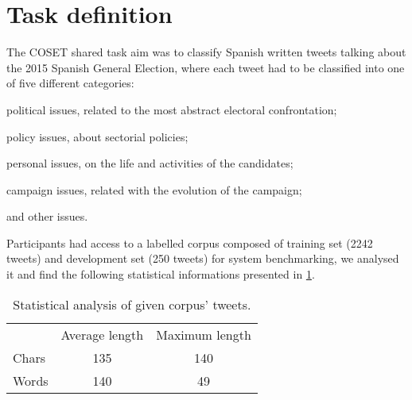 \section{Task definition} \label{sec:task}

The COSET shared task \cite{gimenez2017overview} aim was to classify Spanish written tweets talking about the 2015 Spanish General Election, where each tweet had to be classified into one of five different categories:
\begin{enumerate*}
\item political issues, related to the most abstract electoral confrontation; 
\item policy issues, about sectorial policies; 
\item personal issues, on the life and activities of the candidates; 
\item campaign issues, related with the evolution of the campaign;
\item and other issues.
\end{enumerate*}


Participants had access to a labelled corpus composed of training set (2242 tweets) and development set (250 tweets) for system benchmarking, we analysed it and find the following statistical informations presented in \cref{tab:corpus}.

\begin{comment}
\begin{table}[h]
\footnotesize
\centering
\begin{tabular}{l|cc}
\toprule
\hline
			& Average length	& Maximum length	\\ \hline
Chars		& 135				& 140				\\ 
Words		& 140				& 49				\\ 
\hline
\bottomrule
\end{tabular}
\caption{Statistical analysis of given corpus' tweets.}
\label{tab:corpusOLD}
\end{table}
\end{comment}


\begin{table}[h]
	\centering
	\caption{Statistical analysis of given corpus' tweets.}
	\label{tab:corpus}
	\begin{tabular}{l|cc}
		\hline\noalign{\smallskip}
					& Average length	& Maximum length	\\
		\noalign{\smallskip}
		\hline
		\noalign{\smallskip}
		Chars		& 135				& 140				\\ 
		Words		& 140				& 49				\\ 
		\hline
	\end{tabular}
\end{table}